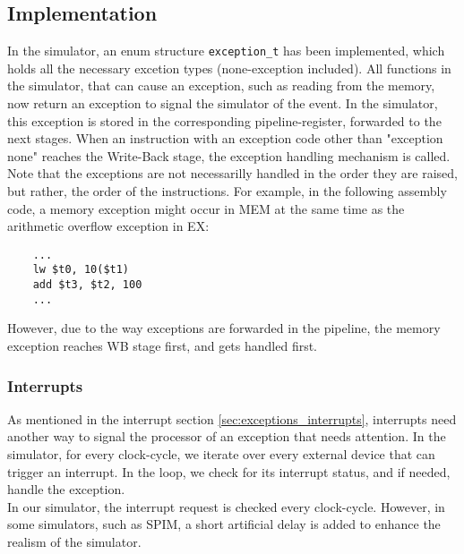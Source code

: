 \subsection{Implementation}
In the simulator, an enum structure \texttt{exception\_t} has been implemented, which
holds all the necessary excetion types (none-exception included).
All functions in the simulator, that can cause an exception, such as reading
from the memory, now return an exception to signal the simulator of the event.
In the simulator, this exception is stored in the corresponding pipeline-register,
forwarded to the next stages. When an instruction with an exception code other
than "exception none" reaches the Write-Back stage, the exception handling
mechanism is called.\\
Note that the exceptions are not necessarilly handled in the order they are
raised, but rather, the order of the instructions. For example, in the following
assembly code, a memory exception might occur in MEM at the same time as the arithmetic
overflow exception in EX:
\begin{lstlisting}
	...
	lw $t0, 10($t1)
	add $t3, $t2, 100
	...
\end{lstlisting}
However, due to the way exceptions are forwarded in the pipeline, the memory
exception reaches WB stage first, and gets handled first.

\subsubsection{Interrupts}
As mentioned in the interrupt section \ref{sec:exceptions_interrupts}, interrupts
need another way to signal the processor of an exception that needs attention.
In the simulator, for every clock-cycle, we iterate over every external device
that can trigger an interrupt.
In the loop, we check for its interrupt status, and if needed, handle the exception.\\
In our simulator, the interrupt request is checked every clock-cycle. However,
in some simulators, such as SPIM, a short artificial delay is added to enhance
the realism of the simulator\cite{cod5:appendix}.


